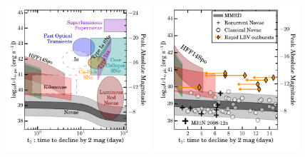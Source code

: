 \begin{figure}[tbp]
\begin{center}
\includegraphics[width=0.48\textwidth]{peakluminosity_vs_declinetime_sn.pdf}
\includegraphics[width=0.48\textwidth]{peakluminosity_vs_declinetime_nova_lbv.pdf}
\caption{ \protect}
\end{center}
\end{figure}


